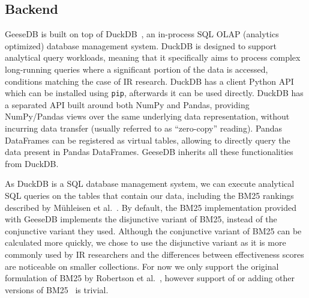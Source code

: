 \subsection{Backend}
GeeseDB is built on top of DuckDB~\cite{duckdb}, an in-process SQL OLAP (analytics optimized) database management system. DuckDB is designed to support analytical query workloads, meaning that it specifically aims to process complex long-running queries where a significant portion of the data is accessed, conditions matching the case of IR research. DuckDB has a client Python API which can be installed using \texttt{pip}, afterwards it can be used directly. DuckDB has a separated API built around both NumPy and Pandas, providing NumPy/Pandas views over the same underlying data representation, without incurring data transfer (usually referred to as ``zero-copy'' reading). Pandas DataFrames can be registered as virtual tables, allowing to directly query the data present in Pandas DataFrames. GeeseDB inherits all these functionalities from DuckDB.

As DuckDB is a SQL database management system, we can execute analytical SQL queries on the tables that contain our data, including the BM25 rankings described by M\"uhleisen et al.~\cite{OldDog}. By default, the BM25 implementation provided with GeeseDB implements the disjunctive variant of BM25, instead of the conjunctive variant they used. Although the conjunctive variant of BM25 can be calculated more quickly, we chose to use the disjunctive variant as it is more commonly used by IR researchers and the differences between effectiveness scores are noticeable on smaller collections. For now we only support the original formulation of BM25 by Robertson et al.~\cite{bm25-robertson}, however support of or adding other versions of BM25~\cite{Kamphuis2020BM25} is trivial.

